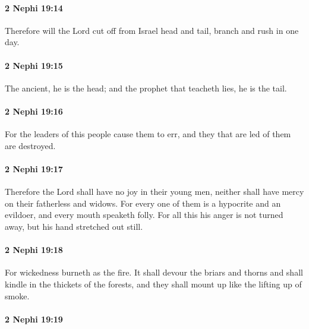 		\paragraph{2 Nephi 19:14} %
			\label{2NEPHI-19-14}

			Therefore will the Lord cut off from Israel head and tail,
			branch and rush in one day.

		\paragraph{2 Nephi 19:15} %
			\label{2NEPHI-19-15}

			The ancient, he is the head;
			and the prophet that teacheth lies, he is the tail.

		\paragraph{2 Nephi 19:16} %
			\label{2NEPHI-19-16}

			For the leaders of this people cause them to err,
			and they that are led of them are destroyed.

		\paragraph{2 Nephi 19:17} %
			\label{2NEPHI-19-17}

			Therefore the Lord shall have no joy in their young men,
			neither shall have mercy on their fatherless and widows.
			For every one of them is a hypocrite and an evildoer,
			and every mouth speaketh folly.
			For all this his anger is not turned away, but his hand stretched out still.

		\paragraph{2 Nephi 19:18} %
			\label{2NEPHI-19-18}

			For wickedness burneth as the fire.
			It shall devour the briars and thorns
			and shall kindle in the thickets of the forests,
			and they shall mount up like the lifting up of smoke.

		\paragraph{2 Nephi 19:19} %
			\label{2NEPHI-19-19}

